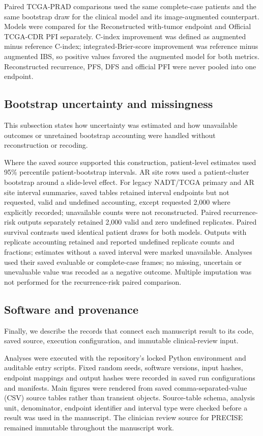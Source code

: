 Paired TCGA-PRAD comparisons used the same complete-case patients and the same bootstrap
draw for the clinical model and its image-augmented counterpart. Models were compared for
the Reconstructed with-tumor endpoint and Official TCGA-CDR PFI separately. C-index
improvement was defined as augmented minus reference C-index; integrated-Brier-score
improvement was reference minus augmented IBS, so positive values favored the augmented
model for both metrics. Reconstructed recurrence, PFS, DFS and official PFI were never
pooled into one endpoint.

\subsection{Bootstrap uncertainty and missingness}

This subsection states how uncertainty was estimated and how unavailable outcomes or
unretained bootstrap accounting were handled without reconstruction or recoding.

Where the saved source supported this construction, patient-level estimates used
95\% percentile patient-bootstrap intervals. AR site rows used a patient-cluster bootstrap
around a slide-level effect. For legacy NADT/TCGA primary and AR site interval summaries,
saved tables retained interval endpoints but not requested, valid and undefined accounting,
except requested 2,000 where explicitly recorded; unavailable counts were not reconstructed.
Paired recurrence-risk outputs separately retained 2,000 valid and zero undefined replicates.
Paired survival contrasts used identical patient draws for both models. Outputs with
replicate accounting retained and reported undefined replicate counts and fractions;
estimates without a saved interval were marked unavailable. Analyses used their
saved evaluable or complete-case frames; no missing, uncertain or unevaluable value was
recoded as a negative outcome. Multiple imputation was not performed for the recurrence-risk paired
comparison.

\subsection{Software and provenance}

Finally, we describe the records that connect each manuscript result to its code, saved
source, execution configuration, and immutable clinical-review input.

Analyses were executed with the repository's locked Python environment and auditable entry
scripts. Fixed random seeds, software versions, input hashes, endpoint mappings and output
hashes were recorded in saved run configurations and manifests. Main figures were rendered
from saved comma-separated-value (CSV) source tables rather than transient objects.
Source-table schema, analysis
unit, denominator, endpoint identifier and interval type were checked before a result was
used in the manuscript. The clinician review source for PRECISE remained immutable throughout
the manuscript work.

